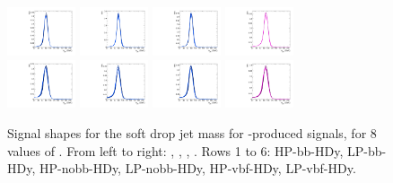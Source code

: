 \begin{figure}[htbp]
  \includegraphics[width=0.18\textwidth]{fig/2Dfit/templateSignalVsMX_fromDC_VBFGbuToWW_MJJ_mu_HP_vbf_HDy.pdf}
  \includegraphics[width=0.18\textwidth]{fig/2Dfit/templateSignalVsMX_fromDC_VBFRadToWW_MJJ_mu_HP_vbf_HDy.pdf}
  \includegraphics[width=0.18\textwidth]{fig/2Dfit/templateSignalVsMX_fromDC_VBFZprToWW_MJJ_mu_HP_vbf_HDy.pdf}
  \includegraphics[width=0.18\textwidth]{fig/2Dfit/templateSignalVsMX_fromDC_VBFWprToWZ_MJJ_mu_HP_vbf_HDy.pdf}\\
  \includegraphics[width=0.18\textwidth]{fig/2Dfit/templateSignalVsMX_fromDC_VBFGbuToWW_MJJ_mu_LP_vbf_HDy.pdf}
  \includegraphics[width=0.18\textwidth]{fig/2Dfit/templateSignalVsMX_fromDC_VBFRadToWW_MJJ_mu_LP_vbf_HDy.pdf}
  \includegraphics[width=0.18\textwidth]{fig/2Dfit/templateSignalVsMX_fromDC_VBFZprToWW_MJJ_mu_LP_vbf_HDy.pdf}
  \includegraphics[width=0.18\textwidth]{fig/2Dfit/templateSignalVsMX_fromDC_VBFWprToWZ_MJJ_mu_LP_vbf_HDy.pdf}\\
  \caption{
    Signal shapes for the soft drop jet mass \MJ for \VBF-produced signals, for 8 values of \MX.
    From left to right: \GBulktoWW, \RadtoWW, \ZprtoWW, \WprtoWZ.
    Rows 1 to 6: HP-bb-HDy, LP-bb-HDy, HP-nobb-HDy, LP-nobb-HDy, HP-vbf-HDy, LP-vbf-HDy.
  }
  \label{fig:MJJShapes_VBF_HDy_Run2}
\end{figure}

